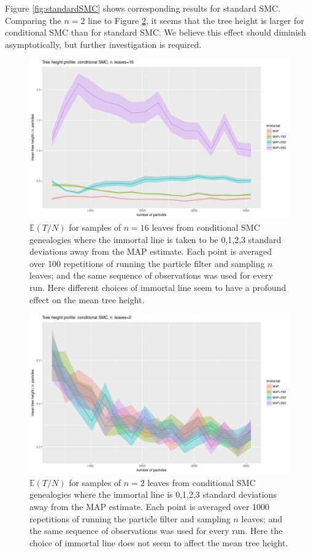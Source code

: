\documentclass{article}
\newcommand{\E}{\mathbb{E}}
\begin{document}
Figure \ref{fig:standardSMC} shows corresponding results for standard SMC. Comparing the $n=2$ line to Figure \ref{fig:kalman_n2}, it seems that the tree height is larger for conditional SMC than for standard SMC. We believe this effect should diminish asymptotically, but further investigation is required.

\begin{figure}
\centering
\includegraphics[width=\textwidth]{kalman_n16_100reps_line.pdf}
\caption{$\E(T/N)$ for samples of $n=16$ leaves from conditional SMC genealogies where the immortal line is taken to be 0,1,2,3 standard deviations away from the MAP estimate. Each point is averaged over 100 repetitions of running the particle filter and sampling $n$ leaves; and the same sequence of observations was used for every run. Here different choices of immortal line seem to have a profound effect on the mean tree height.}
\label{fig:kalman_n16}
\end{figure}
\begin{figure}
\centering
\includegraphics[width=\textwidth]{kalman_n2_1000reps_line.pdf}
\caption{$\E(T/N)$ for samples of $n=2$ leaves from conditional SMC genealogies where the immortal line is 0,1,2,3 standard deviations away from the MAP estimate. Each point is averaged over 1000 repetitions of running the particle filter and sampling $n$ leaves; and the same sequence of observations was used for every run. Here the choice of immortal line does not seem to affect the mean tree height.}
\label{fig:kalman_n2}
\end{figure}
\end{document}
